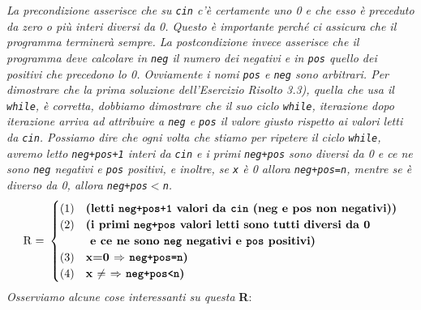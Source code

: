 \noindent \textit{La precondizione asserisce che su \texttt{cin} c'è certamente uno 0 e che esso è preceduto da zero o più interi diversi da 0.
Questo è importante perché ci assicura che il programma terminerà sempre.
La postcondizione invece asserisce che il programma deve calcolare in \texttt{neg} il numero dei negativi e in \texttt{pos} quello dei positivi che precedono lo 0.
Ovviamente i nomi \texttt{pos} e \texttt{neg} sono arbitrari.
Per dimostrare che la prima soluzione dell'Esercizio Risolto 3.3), quella che usa il \texttt{while}, è corretta, dobbiamo dimostrare che il suo ciclo \texttt{while}, iterazione dopo iterazione arriva ad attribuire a \texttt{neg} e \texttt{pos} il valore giusto rispetto ai valori letti da \texttt{cin}.
Possiamo dire che ogni volta che stiamo per ripetere il ciclo \texttt{while}, avremo letto \texttt{neg+pos+1} interi da \texttt{cin} e i primi \texttt{neg+pos} sono diversi da 0 e ce ne sono \texttt{neg} negativi e \texttt{pos} positivi, e inoltre, se \texttt{x} è 0 allora \texttt{neg+pos=n}, mentre se è diverso da 0, allora \texttt{neg+pos$<$n}.}
\[
\text{R = }
\begin{cases}
(1) & \textbf{(letti \texttt{neg+pos+1} valori da \texttt{cin} (neg e pos non negativi))} \\
(2) & \textbf{(i primi \texttt{neg+pos} valori letti sono tutti diversi da 0} \\
	& \textbf{ e ce ne sono \texttt{neg} negativi e \texttt{pos} positivi)} \\
(3) & \textbf{x=0 $\Rightarrow$ \texttt{neg+pos=n})} \\
(4) & \textbf{x $\neq$ $\Rightarrow$ \texttt{neg+pos<n})}
\end{cases}
\]
\textit{Osserviamo alcune cose interessanti su questa} \textbf{R}:


